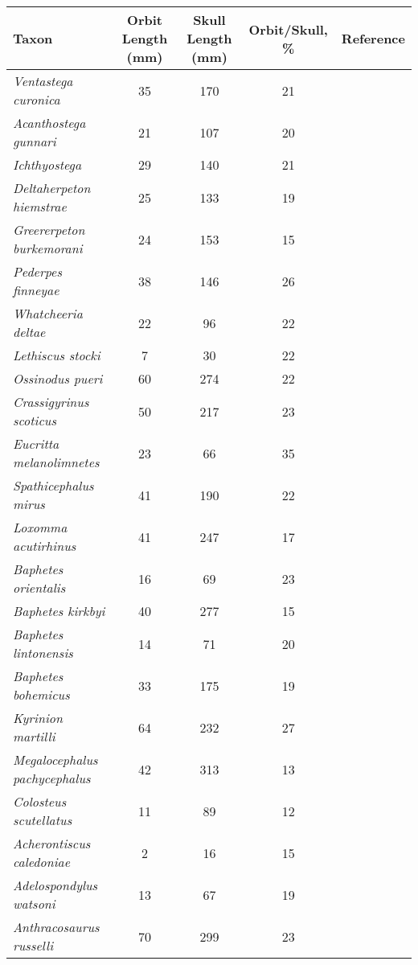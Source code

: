 \begin{tabular}{|L{4.5cm}|c|c|c|L{4.5cm}|}
\hline
\textbf{Taxon}&\textbf{Orbit Length (mm)}&\textbf{Skull Length (mm)}&\textbf{Orbit/Skull, \%}&\textbf{Reference}\\\hline
\textit{Ventastega curonica}&35&170&21&\citet{Ahlb08a}\\\hline
\textit{Acanthostega gunnari}&21&107&20&\citet{Clac02b,Porr15a}\\\hline
\textit{Ichthyostega}&29&140&21&\citet{Bent90a}\\\hline
\textit{Deltaherpeton hiemstrae}&25&133&19&\citet{Bolt10a}\\\hline
\textit{Greererpeton burkemorani}&24&153&15&\citet{Bent90a}\\\hline
\textit{Pederpes finneyae}&38&146&26&\citet{Clac02a}\\\hline
\textit{Whatcheeria deltae}&22&96&22&\citet{Lomb95a}\\\hline
\textit{Lethiscus stocki}&7&30&22&\citet{Well82a}\\\hline
\textit{Ossinodus pueri}&60&274&22&\citet{Warr04a,Warr07a}\\\hline
\textit{Crassigyrinus scoticus}&50&217&23&\citet{Panc85a}\\\hline
\textit{Eucritta melanolimnetes}&23&66&35&\citet{Clac98a}\\\hline
\textit{Spathicephalus mirus}&41&190&22&\citet{Beau98a}\\\hline
\textit{Loxomma acutirhinus}&41&247&17&\citet{Beau77a}\\\hline
\textit{Baphetes orientalis}&16&69&23&\citet{Miln09a}\\\hline
\textit{Baphetes kirkbyi}&40&277&15&\citet{Beau77a}\\\hline
\textit{Baphetes lintonensis}&14&71&20&\citet{Beau77a}\\\hline
\textit{Baphetes bohemicus}&33&175&19&\citet{Beau77a}\\\hline
\textit{Kyrinion martilli}&64&232&27&\citet{Clac03a}\\\hline
\textit{Megalocephalus pachycephalus}&42&313&13&\citet{Beau77a}\\\hline
\textit{Colosteus scutellatus}&11&89&12&\citet{Hook83a}\\\hline
\textit{Acherontiscus caledoniae}&2&16&15&\citet{Carr69a}\\\hline
\textit{Adelospondylus watsoni}&13&67&19&\citet{Carr67a}\\\hline
\textit{Anthracosaurus russelli}&70&299&23&\citet{Panc77a}\\\hline

\end{tabular}
